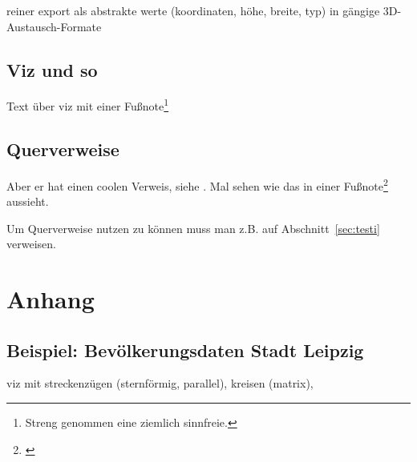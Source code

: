 \documentclass[a4paper, 12pt, onepage, pdftex, headsepline, footsepline]{scrreprt}
\begin{document}
reiner export als abstrakte werte (koordinaten, höhe, breite, typ) in gängige 3D-Austausch-Formate

\section*{Viz und so}

Text über viz mit einer Fußnote\footnote{Streng genommen eine ziemlich sinnfreie.}

\section*{Querverweise}

Aber er hat einen coolen Verweis, siehe \cite[S.\,35--38]{Visualisierung}.
Mal sehen wie das in einer Fußnote\footnote{\cite{Visualisierung}} aussieht.

Um Querverweise nutzen zu können muss man z.B. auf Abschnitt~\ref{sec:testi} verweisen.



\listoftables
\listoffigures
\chapter{Anhang}
\section{Beispiel: Bevölkerungsdaten Stadt Leipzig}
viz mit streckenzügen (sternförmig, parallel), kreisen (matrix),
\end{document}
